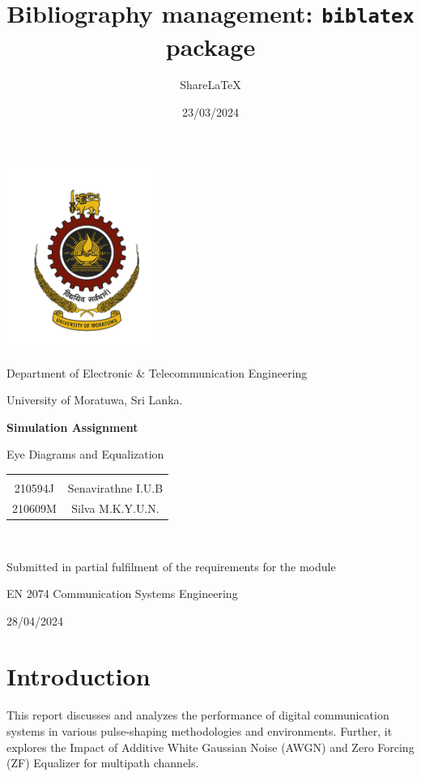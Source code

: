 \documentclass{article}
\title{Bibliography management: \texttt{biblatex} package}
\author{Share\LaTeX}
\date{23/03/2024}
\begin{document}
	
	\begin{titlepage}
		
		\centering
		\vspace*{0.5cm}
		\includegraphics[width=5cm]{logo.png} %
		\par\vspace{0.02cm}
		Department of Electronic \& Telecommunication Engineering
  
            University of Moratuwa, Sri Lanka.
		\par\vspace{4.5cm}
		{\LARGE\bfseries Simulation Assignment}\\{\LARGE Eye Diagrams and Equalization\par}
		\vspace{3.7cm}
		\begin{tabular}{c c}
			& \\
            210594J &   Senavirathne I.U.B\\
            210609M	&	Silva M.K.Y.U.N.\\
		\end{tabular}\\
		\vspace{1.5cm}
            {Submitted in partial fulfilment of the requirements for the module\par}
		{EN 2074 Communication Systems Engineering\par}
	
		\vspace{0.5cm}
		{\large 28/04/2024\par}
		\vfill
	\end{titlepage}

        \newpage
        \tableofcontents
	\newpage

        \section{Introduction}
        This report discusses and analyzes the performance of digital communication systems in various pulse-shaping methodologies and environments. Further, it explores the Impact of Additive White Gaussian Noise (AWGN) and Zero Forcing (ZF) Equalizer for multipath channels.\\
\end{document}

